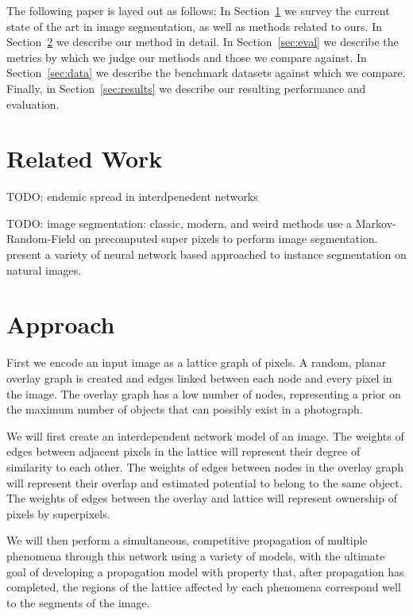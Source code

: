 \documentclass[twocolumn]{article}
\newcommand{\todo}[1]{}
\renewcommand{\todo}[1]{{\color{red} TODO: {#1}}}
\newcommand{\secref}[1]{Section~\ref{sec:#1}}
\newcommand{\seclab}[1]{\label{sec:#1}}
\begin{document}
The following paper is layed out as follows: In \secref{related} we survey the current state of the art in image segmentation,
as well as methods related to ours. In \secref{approach} we describe our method in detail. In \secref{eval} we describe the
metrics by which we judge our methods and those we compare against. In \secref{data} we describe the benchmark datasets
against which we compare. Finally, in \secref{results} we describe our resulting performance and evaluation.

\section{Related Work}\seclab{related}

\todo{endemic spread in interdpenedent networks}

\todo{image segmentation: classic, modern, and weird methods}
\cite{pei2014saliency} use a Markov-Random-Field on precomputed super pixels to perform image segmentation.
\cite{newell2017associative,li2017fully,ren2017end} present a variety of neural network based approached to instance
segmentation on natural images.

\section{Approach}\seclab{approach}

First we encode an input image as a lattice graph of pixels. A random, planar overlay graph is created and edges linked
between each node and every pixel in the image. The overlay graph has a low number of nodes, representing a prior on the
maximum number of objects that can possibly exist in a photograph. 

We will first create an interdependent network model of an image. The weights of edges between adjacent pixels in the lattice
will represent their degree of similarity to each other. The weights of edges between nodes in the overlay graph will
represent their overlap and estimated potential to belong to the same object. The weights of edges between the overlay and
lattice will represent ownership of pixels by superpixels.

We will then perform a simultaneous, competitive propagation of multiple phenomena through this network using a variety of
models, with the ultimate goal of developing a propagation model with property that, after propagation has completed, the
regions of the lattice affected by each phenomena correspond well to the segments of the image.
\end{document}
